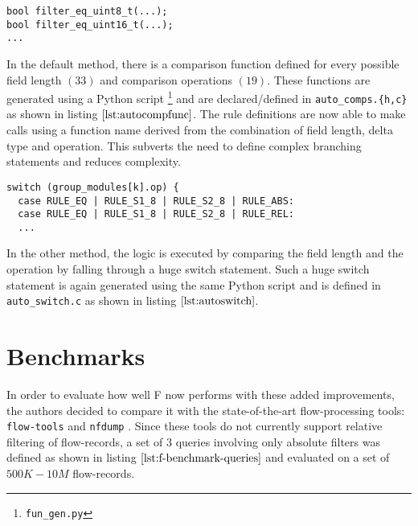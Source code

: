 \begin{lstlisting}
bool filter_eq_uint8_t(...);
bool filter_eq_uint16_t(...);
...
\end{lstlisting}
In the default method, there is a comparison function defined for every possible field length $(33)$ and comparison operations $(19)$. These functions are generated using a Python script \footnote{\texttt{fun\_gen.py}} and are declared/defined in \texttt{auto\_comps.\{h,c\}} as shown in listing $\ref{lst:autocompfunc}$. The rule definitions are now able to make calls using a function name derived from the combination of field length, delta type and operation. This subverts the need to define complex branching statements and reduces complexity. 

\begin{lstlisting}
switch (group_modules[k].op) {
  case RULE_EQ | RULE_S1_8 | RULE_S2_8 | RULE_ABS:
  case RULE_EQ | RULE_S1_8 | RULE_S2_8 | RULE_REL:
  ...
\end{lstlisting}
In the other method, the logic is executed by comparing the field length and the operation  by falling through a huge switch statement. Such a huge switch statement is again generated using the same Python script and is defined in \texttt{auto\_switch.c} as shown in listing $\ref{lst:autoswitch}$.  

\section{Benchmarks}\label{sec:f-benchmarks}
In order to evaluate how well F now performs with these added improvements, the authors decided to compare it with the state-of-the-art flow-processing tools: \texttt{flow-tools} \cite{sromig:2000} and \texttt{nfdump} \cite{phaag:2006}. Since these  tools do not currently support relative filtering of flow-records, a set of $3$ queries involving only absolute filters was defined as shown in listing $\ref{lst:f-benchmark-queries}$ and evaluated on a set of $500K-10M$ flow-records.  

